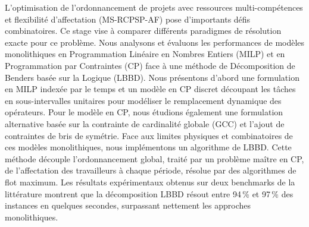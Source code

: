 L'optimisation de l'ordonnancement de projets avec ressources multi-compétences et flexibilité d'affectation (MS-RCPSP-AF) pose d'importants défis combinatoires. Ce stage vise à comparer différents paradigmes de résolution exacte pour ce problème. Nous analysons et évaluons les performances de modèles monolithiques en Programmation Linéaire en Nombres Entiers (MILP) et en Programmation par Contraintes (CP) face à une méthode de Décomposition de Benders basée sur la Logique (LBBD).
\smallskip
\noindent
Nous présentons d'abord une formulation en MILP indexée par le temps et un modèle en CP discret découpant les tâches en sous-intervalles unitaires pour modéliser le remplacement dynamique des opérateurs. Pour le modèle en CP, nous étudions également une formulation alternative basée sur la contrainte de cardinalité globale (GCC) et l'ajout de contraintes de bris de symétrie. Face aux limites physiques et combinatoires de ces modèles monolithiques, nous implémentons un algorithme de LBBD. Cette méthode découple l'ordonnancement global, traité par un problème maître en CP, de l'affectation des travailleurs à chaque période, résolue par des algorithmes de flot maximum.
\smallskip
\noindent
Les résultats expérimentaux obtenus sur deux benchmarks de la littérature montrent que la décomposition LBBD résout entre 94\,\% et 97\,\% des instances en quelques secondes, surpassant nettement les approches monolithiques.


